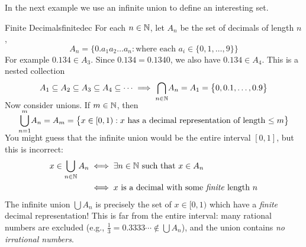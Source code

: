
	

%

In the next example we use an infinite union to define an interesting set.

\begin{example}{Finite Decimals}{finitedec}
	For each $n\in\mathbb{N}$, let $A_n$ be the set of decimals of length $n$,
	\[
		A_n=\bigl\{0.a_1a_2\ldots a_n:\text{where each $a_i\in\{0,1,\ldots,9\}$}\bigr\}
	\]
	For example $0.134\in A_3$. Since $0.134=0.1340$, we also have $0.134\in A_4$. This is a nested collection
	\[
		A_1\subseteq A_2\subseteq A_3\subseteq A_4\subseteq\cdots \implies \smash[b]{\bigcap_{n\in\mathbb{N}}}A_n=A_1=\bigl\{0,0.1,\ldots,0.9\bigr\}
	\]
	Now consider unions. If $m\in\mathbb{N}$, then
	\[
		\smash{\bigcup_{n=1}^m}A_n=A_m=\bigl\{x\in [0,1):x\text{ has a decimal representation of length $\le m$}\bigr\}
	\]
	You might guess that the infinite union would be the entire\footnotemark{} interval $[0,1]$, but this is incorrect:
	\begin{align*}
		x\in\bigcup_{n\in\mathbb{N}}A_n &\iff\exists n\in\mathbb{N}\text{ such that }x\in A_n\\
		&\iff x\text{ is a decimal with some \emph{finite} length $n$}
	\end{align*}
	The infinite union $\bigcup A_n$ is precisely the set of $x\in[0,1)$ which have a \emph{finite} decimal representation! This is far from the entire interval: many rational numbers are excluded (e.g., $\frac 13=0.3333\cdots \notin\bigcup A_n$), and the union contains \emph{no irrational numbers}. %
\end{example}

